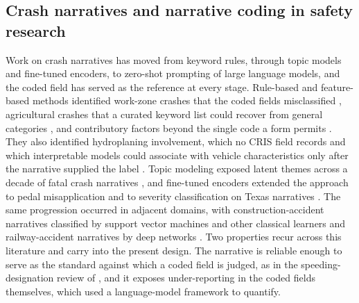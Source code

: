 \subsection{Crash narratives and narrative coding in safety research}
\label{sec:bg-narratives}

Work on crash narratives has moved from keyword rules, through topic models and fine-tuned
encoders, to zero-shot prompting of large language models, and the coded field has served as
the reference at every stage. Rule-based and feature-based methods identified work-zone
crashes that the coded fields misclassified \citep{sayed2021identifica}, agricultural crashes
that a curated keyword list could recover from general categories \citep{kim2021crash}, and
contributory factors beyond the single code a form permits \citep{zou2024crashcausi}. They
also identified hydroplaning involvement, which no CRIS field records and which interpretable
models could associate with vehicle characteristics only after the narrative supplied the
label \citep{das2020hydroplaning}. Topic modeling exposed latent themes across a decade of fatal
crash narratives \citep{kwayu2021}, and fine-tuned encoders extended the approach to pedal
misapplication \citep{bareiss2021finding} and to severity classification on Texas narratives
\citep{oliaee2023using}. The same progression occurred in adjacent domains, with construction-accident narratives classified by support vector machines and other classical learners \citep{goh2017construction} and railway-accident narratives by deep networks
\citep{heidarysafa2018railway}. Two properties recur across this literature and carry into the present design. The narrative
is reliable enough to serve as the standard against which a coded field is judged, as in the
speeding-designation review of \citet{fitzpatrick2017an}, and it exposes under-reporting in
the coded fields themselves, which \citet{arteaga2025a} used a language-model framework to
quantify.

